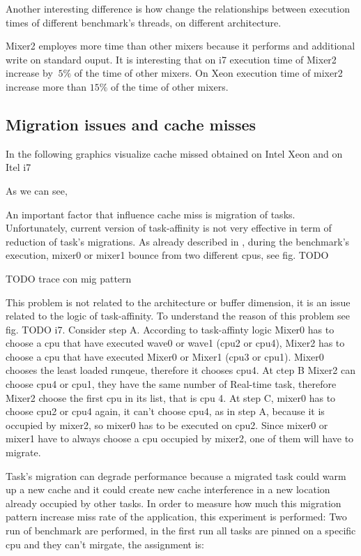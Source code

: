 Another interesting difference is how change the relationships between execution times of different benchmark's threads, on different architecture. 

Mixer2 employes more time than other mixers because it performs and additional write on standard ouput. It is interesting that on i7 execution time of 
Mixer2 increase by $~ 5\%$ of the time of other mixers. On Xeon execution time of mixer2 increase more than $15\%$ of the time of other mixers. 



\subsection{Migration issues and cache misses}

In the following graphics visualize cache missed obtained on Intel Xeon and on Itel i7
 
As we can see,  

An important factor that influence cache miss is migration of tasks. Unfortunately, current version of task-affinity is not very effective in term of 
reduction of task's migrations. As already described in \cite{lcs}, during the benchmark's execution, mixer0 or mixer1 bounce from two different cpus, see
fig. TODO 

TODO trace con mig pattern

This problem is not related to the architecture or buffer dimension, it is an issue related to the logic of task-affinity. To understand the reason of 
this problem see fig. TODO i7. Consider step A. According to task-affinty logic Mixer0 has to choose a cpu that have executed wave0 or wave1 
(cpu2 or cpu4), Mixer2 has to choose a cpu that have executed Mixer0 or Mixer1 (cpu3 or cpu1). Mixer0 chooses the least loaded runqeue, therefore it 
chooses cpu4. At ctep B Mixer2 can choose cpu4 or cpu1, they have the same number of Real-time task, therefore Mixer2 choose the first cpu in its list, 
that is cpu 4. At step C, mixer0 has to choose cpu2 or cpu4 again, it can't choose cpu4, as in step A, because it is occupied by mixer2, so mixer0 has to
be executed on cpu2. Since mixer0 or mixer1 have to always choose a cpu occupied by mixer2, one of them will have to migrate.

Task's migration can degrade performance because a migrated task could warm up a new cache and it could create new cache interference in a new location 
already occupied by other tasks. In order to measure how much this migration pattern increase miss rate of the application, this experiment is performed:
Two run of benchmark are performed, in the first run all tasks are pinned on a specific cpu and they can't mirgate, the assignment is: 


